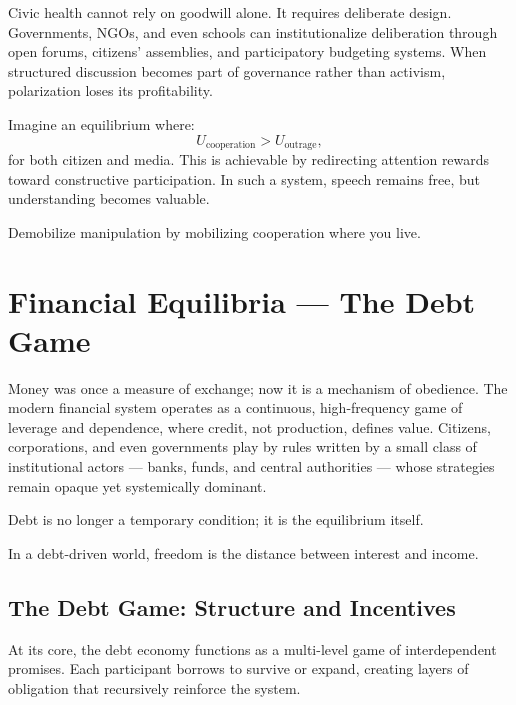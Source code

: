 \documentclass[12pt,twoside]{book}
\begin{document}
Civic health cannot rely on goodwill alone.  
It requires deliberate design.  
Governments, NGOs, and even schools can institutionalize deliberation through open forums, citizens’ assemblies, and participatory budgeting systems.  
When structured discussion becomes part of governance rather than activism, polarization loses its profitability.

Imagine an equilibrium where:
\[
U_{\text{cooperation}} > U_{\text{outrage}},
\]
for both citizen and media.  
This is achievable by redirecting attention rewards toward constructive participation.  
In such a system, speech remains free, but understanding becomes valuable. \\

\begin{keyidea}
Demobilize manipulation by mobilizing cooperation where you live.
\end{keyidea}
\chapter{Financial Equilibria — The Debt Game}

Money was once a measure of exchange; now it is a mechanism of obedience.  
The modern financial system operates as a continuous, high-frequency game of leverage and dependence, where credit, not production, defines value.  
Citizens, corporations, and even governments play by rules written by a small class of institutional actors --- banks, funds, and central authorities --- whose strategies remain opaque yet systemically dominant.  

Debt is no longer a temporary condition; it is the equilibrium itself. \\

\begin{keyidea}
In a debt-driven world, freedom is the distance between interest and income.
\end{keyidea}

\section{The Debt Game: Structure and Incentives}

At its core, the debt economy functions as a multi-level game of interdependent promises.  
Each participant borrows to survive or expand, creating layers of obligation that recursively reinforce the system.
\end{document}
